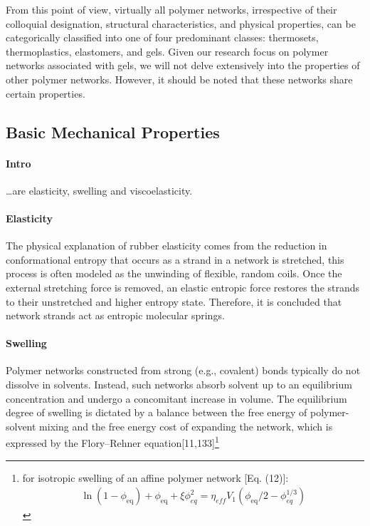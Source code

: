 From this point of view, virtually all polymer networks, irrespective of their colloquial designation, structural characteristics, and physical properties, can be categorically classified into one of four predominant classes: thermosets, thermoplastics, elastomers, and gels\citep{guPolymerNetworksPlastics2020}.
Given our research focus on polymer networks associated with gels, we will not delve extensively into the properties of other polymer networks. 
However, it should be noted that these networks share certain properties.

\subsection{Basic Mechanical Properties}

\paragraph{Intro} \dots are elasticity, swelling and viscoelasticity.

\paragraph{Elasticity} The physical explanation of rubber elasticity comes from the reduction in conformational entropy that occurs as a strand in a network is stretched, this process is often modeled as the unwinding of flexible, random coils. 
Once the external stretching force is removed, an elastic entropic force restores the strands to their unstretched and higher entropy state. 
Therefore, it is concluded that network strands act as entropic molecular springs\citep{guPolymerNetworksPlastics2020}. 

\paragraph{Swelling} Polymer networks constructed from strong (e.g., covalent) bonds typically do not dissolve in solvents. 
Instead, such networks absorb solvent up to an equilibrium concentration and undergo a concomitant increase in volume. 
The equilibrium degree of swelling is dictated by a balance between the free energy of polymer-solvent mixing and the free energy cost of expanding the network, which is expressed by the Flory–Rehner equation[11,133]\footnote{for isotropic swelling of an affine polymer network [Eq. (12)]:
    \begin{gather*}
        \ln(1-\phi_{\mathrm{eq}}) + \phi_{\mathrm{eq}} + \xi\phi^2_{eq} = \eta_{eff}V_1(\phi_{\mathrm{eq}}/2-\phi^{1/3}_{eq})
    \end{gather*}
}

